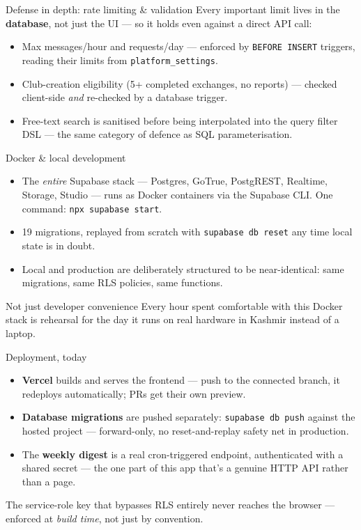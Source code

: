 \documentclass[aspectratio=169,11pt]{beamer}
\newcommand{\code}[1]{\textcolor{olkTealDark}{\texttt{#1}}}
\begin{document}
\begin{frame}{Defense in depth: rate limiting \& validation}
  Every important limit lives in the \textbf{database}, not just the UI --- so it holds even against a direct API call:
  \begin{itemize}
    \item Max messages/hour and requests/day --- enforced by \code{BEFORE INSERT} triggers, reading their limits from \code{platform\_settings}.
    \item Club-creation eligibility (5+ completed exchanges, no reports) --- checked client-side \emph{and} re-checked by a database trigger.
    \item Free-text search is sanitised before being interpolated into the query filter DSL --- the same category of defence as SQL parameterisation.
  \end{itemize}
\end{frame}

\begin{frame}{Docker \& local development}
  \begin{itemize}
    \item The \emph{entire} Supabase stack --- Postgres, GoTrue, PostgREST, Realtime, Storage, Studio --- runs as Docker containers via the Supabase CLI. One command: \code{npx supabase start}.
    \item 19 migrations, replayed from scratch with \code{supabase db reset} any time local state is in doubt.
    \item Local and production are deliberately structured to be near-identical: same migrations, same RLS policies, same functions.
  \end{itemize}
  \vfill
  \begin{alertblock}{Not just developer convenience}
    Every hour spent comfortable with this Docker stack is rehearsal for the day it runs on real hardware in Kashmir instead of a laptop.
  \end{alertblock}
\end{frame}

\begin{frame}{Deployment, today}
  \begin{itemize}
    \item \textbf{Vercel} builds and serves the frontend --- push to the connected branch, it redeploys automatically; PRs get their own preview.
    \item \textbf{Database migrations} are pushed separately: \code{supabase db push} against the hosted project --- forward-only, no reset-and-replay safety net in production.
    \item The \textbf{weekly digest} is a real cron-triggered endpoint, authenticated with a shared secret --- the one part of this app that's a genuine HTTP API rather than a page.
  \end{itemize}
  \vfill
  \small The service-role key that bypasses RLS entirely never reaches the browser --- enforced at \emph{build time}, not just by convention.
\end{frame}
\end{document}

